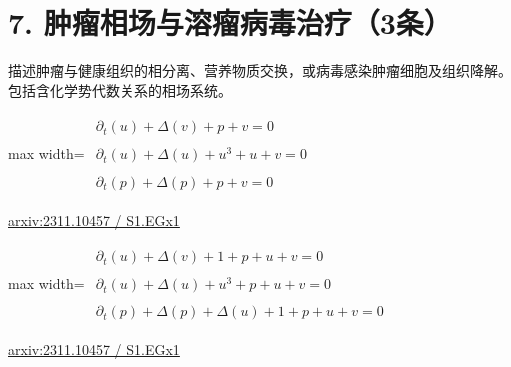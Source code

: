 \documentclass[UTF8,10pt,a4paper,fontset=mac]{ctexart}
\begin{document}
\section*{7. 肿瘤相场与溶瘤病毒治疗（3条）}
描述肿瘤与健康组织的相分离、营养物质交换，或病毒感染肿瘤细胞及组织降解。包括含化学势代数关系的相场系统。\par\medskip

\begin{minipage}{\linewidth}\begin{center}\begin{adjustbox}{max width=\linewidth}$\displaystyle\begin{gathered}\begin{gathered}\partial_{t}(u)+\Delta(v)+p+v=0\end{gathered}\\[5pt]\begin{gathered}\partial_{t}(u)+\Delta(u)+u^{3}+u+v=0\end{gathered}\\[5pt]\begin{gathered}\partial_{t}(p)+\Delta(p)+p+v=0\end{gathered}\end{gathered}$\end{adjustbox}\end{center}{\small\href{https://arxiv.org/html/2311.10457#S1.EGx1}{arxiv:2311.10457 / S1.EGx1}}\par\end{minipage}\par\vspace{6mm}

\begin{minipage}{\linewidth}\begin{center}\begin{adjustbox}{max width=\linewidth}$\displaystyle\begin{gathered}\begin{gathered}\partial_{t}(u)+\Delta(v)+1+p+u+v=0\end{gathered}\\[5pt]\begin{gathered}\partial_{t}(u)+\Delta(u)+u^{3}+p+u+v=0\end{gathered}\\[5pt]\begin{gathered}\partial_{t}(p)+\Delta(p)+\Delta(u)+1+p+u+v=0\end{gathered}\end{gathered}$\end{adjustbox}\end{center}{\small\href{https://arxiv.org/html/2311.10457#S1.EGx1}{arxiv:2311.10457 / S1.EGx1}}\par\end{minipage}\par\vspace{6mm}
\end{document}
